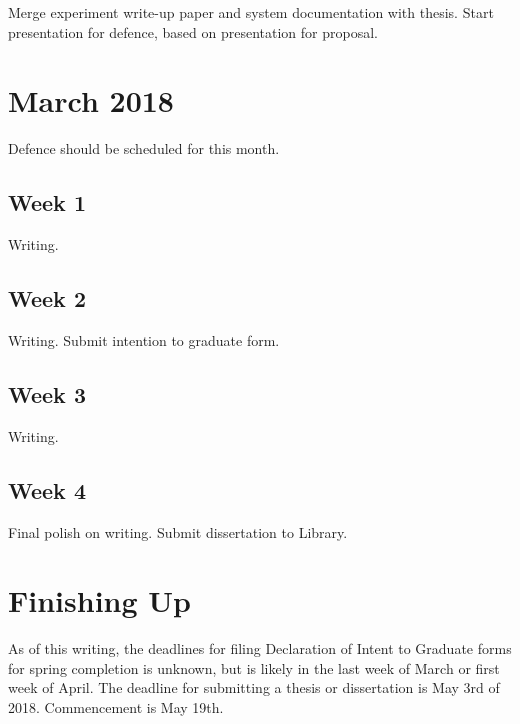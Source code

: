 Merge experiment write-up paper and system documentation with thesis.
Start presentation for defence, based on presentation for proposal. 

\section{March 2018}

%
%
%

Defence should be scheduled for this month. 

\subsection{Week 1}

Writing.

\subsection{Week 2}

Writing.
Submit intention to graduate form. 

\subsection{Week 3}

Writing.

\subsection{Week 4}

Final polish on writing. 
Submit dissertation to Library. 

\section{Finishing Up}

As of this writing, the deadlines for filing Declaration of Intent to Graduate forms for spring completion is unknown, but is likely in the last week of March or first week of April. 
The deadline for submitting a thesis or dissertation is May 3rd of 2018. 
Commencement is May 19th. 

